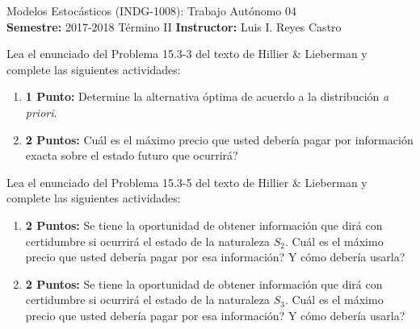 \documentclass[ a4paper, twoside, 11pt]{article}
\newcommand{\numero}{04}
\begin{document}
\allowdisplaybreaks



\begin{center}
\Large Modelos Estoc\'asticos (INDG-1008): Trabajo Aut\'onomo \numero \\[1ex]
\small \textbf{Semestre:} 2017-2018 T\'ermino II \qquad
\textbf{Instructor:} Luis I. Reyes Castro
\end{center}
\fullskip

%
\halfskip

\begin{problem}
\label{prob:H&L_P15_3_3} Lea el enunciado del Problema 15.3-3 del texto de Hillier \& Lieberman y complete las siguientes actividades: 
\begin{enumerate}[label=\textbf{\alph*)}]
\item \textbf{1 Punto:} Determine la alternativa \'optima de acuerdo a la distribuci\'on \emph{a priori}. 
\item \textbf{2 Puntos:} Cu\'al es el m\'aximo precio que usted deber\'ia pagar por informaci\'on exacta sobre el estado futuro que ocurrir\'a?
\end{enumerate}

\end{problem}
\fullskip

\begin{problem}
\label{prob:H&L_P15_3_5} Lea el enunciado del Problema 15.3-5 del texto de Hillier \& Lieberman y complete las siguientes actividades: 
\begin{enumerate}[label=\textbf{\alph*)}]
\item \textbf{2 Puntos:} Se tiene la oportunidad de obtener informaci\'on que dir\'a con certidumbre si ocurrir\'a el estado de la naturaleza $S_2$. Cu\'al es el m\'aximo precio que usted deber\'ia pagar por esa informaci\'on? Y c\'omo deber\'ia usarla? 
\item \textbf{2 Puntos:} Se tiene la oportunidad de obtener informaci\'on que dir\'a con certidumbre si ocurrir\'a el estado de la naturaleza $S_3$. Cu\'al es el m\'aximo precio que usted deber\'ia pagar por esa informaci\'on? Y c\'omo deber\'ia usarla? 
\end{enumerate}


\end{problem}
\fullskip
\end{document}
